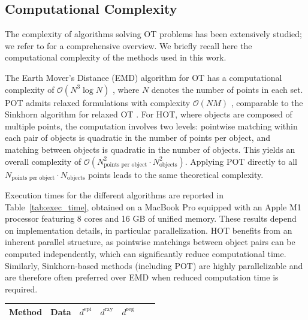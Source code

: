 \documentclass[10pt, twocolumn]{article}
\theoremstyle{definition}
\begin{document}
\subsection{Computational Complexity}

{\color{black}
The complexity of algorithms solving OT problems has been extensively studied; we refer to \cite{COTFNT} for a comprehensive overview. We briefly recall here the computational complexity of the methods used in this work.

The Earth Mover’s Distance (EMD) algorithm for OT has a computational complexity of $\mathcal{O}(N^3 \log N)$ \cite{complexityEMD}, where $N$ denotes the number of points in each set. POT admits relaxed formulations with complexity $\mathcal{O}(N M)$ \cite{POTcomplexity}, comparable to the Sinkhorn algorithm for relaxed OT \cite{COTFNT}.
For HOT, where objects are composed of multiple points, the computation involves two levels: pointwise matching within each pair of objects is quadratic in the number of points per object, and matching between objects is quadratic in the number of objects. This yields an overall complexity of
$
\mathcal{O}(
N_{\text{points per object}}^2
\cdot
N_{\text{objects}}^2
).
$
Applying POT directly to all $N_{\text{points per object}} \cdot N_{\text{objects}}$ points leads to the same theoretical complexity.

Execution times for the different algorithms are reported in Table~\ref{tab:exec_time}, obtained on a MacBook Pro equipped with an Apple M1 processor featuring 8 cores and 16 GB of unified memory.
These results depend on implementation details, in particular parallelization. HOT benefits from an inherent parallel structure, as pointwise matchings between object pairs can be computed independently, which can significantly reduce computational time. Similarly, Sinkhorn-based methods (including POT) are highly parallelizable and are therefore often preferred over EMD when reduced computation time is required.

\begin{table}[htb!]
\centering
\small
\begin{tabular}{|l|l|l|l|l|l|l|}
\hline
\textbf{Method} & \textbf{Data} & \textbf{$d^{\text{epi}}$} & \textbf{$d^{\text{ray}}$} & \textbf{$d^{\text{reg}}$} \\
\hline


\end{tabular}
\end{table}}
\end{document}
